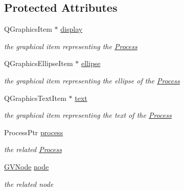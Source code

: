 \subsection*{\-Protected \-Attributes}
\begin{DoxyCompactItemize}
\item 
\hypertarget{class_g_process_afcb6a6765219d5ca69f23b89a147a7db}{\-Q\-Graphics\-Item $\ast$ \hyperlink{class_g_process_afcb6a6765219d5ca69f23b89a147a7db}{display}}\label{class_g_process_afcb6a6765219d5ca69f23b89a147a7db}

\begin{DoxyCompactList}\small\item\em the graphical item representing the \hyperlink{class_process}{\-Process} \end{DoxyCompactList}\item 
\hypertarget{class_g_process_ac0770d84d26f835cd409cb1bbd5a2408}{\-Q\-Graphics\-Ellipse\-Item $\ast$ \hyperlink{class_g_process_ac0770d84d26f835cd409cb1bbd5a2408}{ellipse}}\label{class_g_process_ac0770d84d26f835cd409cb1bbd5a2408}

\begin{DoxyCompactList}\small\item\em the graphical item representing the ellipse of the \hyperlink{class_process}{\-Process} \end{DoxyCompactList}\item 
\hypertarget{class_g_process_a4ff36f4f6daae75d094c53d837ad4ecc}{\-Q\-Graphics\-Text\-Item $\ast$ \hyperlink{class_g_process_a4ff36f4f6daae75d094c53d837ad4ecc}{text}}\label{class_g_process_a4ff36f4f6daae75d094c53d837ad4ecc}

\begin{DoxyCompactList}\small\item\em the graphical item representing the text of the \hyperlink{class_process}{\-Process} \end{DoxyCompactList}\item 
\hypertarget{class_g_process_adb2d4b43a105c00b5be1f5bc405a3f43}{\-Process\-Ptr \hyperlink{class_g_process_adb2d4b43a105c00b5be1f5bc405a3f43}{process}}\label{class_g_process_adb2d4b43a105c00b5be1f5bc405a3f43}

\begin{DoxyCompactList}\small\item\em the related \hyperlink{class_process}{\-Process} \end{DoxyCompactList}\item 
\hypertarget{class_g_process_a83a9972757f06e9eff7fe120ac9f2b5b}{\hyperlink{struct_g_v_node}{\-G\-V\-Node} \hyperlink{class_g_process_a83a9972757f06e9eff7fe120ac9f2b5b}{node}}\label{class_g_process_a83a9972757f06e9eff7fe120ac9f2b5b}

\begin{DoxyCompactList}\small\item\em the related node \end{DoxyCompactList}\end{DoxyCompactItemize}


